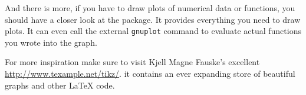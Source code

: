 And there is more, if you have to draw plots of numerical data or
functions, you should have a closer look at the  
package. It provides everything you need to draw plots. It can even
call the external \texttt{gnuplot} command to evaluate actual
functions you wrote into the graph.

For more inspiration make sure to visit Kjell Magne Fauske's excellent \url{http://www.texample.net/tikz/}.
it contains an ever expanding store of beautiful graphs and other \LaTeX{} code.

